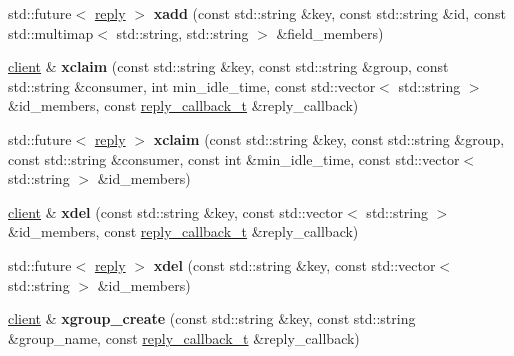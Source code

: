 \begin{DoxyCompactItemize}
std\+::future$<$ \mbox{\hyperlink{classcpp__redis_1_1reply}{reply}} $>$ {\bfseries xadd} (const std\+::string \&key, const std\+::string \&id, const std\+::multimap$<$ std\+::string, std\+::string $>$ \&field\+\_\+members)
\item 
\mbox{\label{classcpp__redis_1_1client_a1c8ca282fc8a80860a7a2c56761debf4}} 
\mbox{\hyperlink{classcpp__redis_1_1client}{client}} \& {\bfseries xclaim} (const std\+::string \&key, const std\+::string \&group, const std\+::string \&consumer, int min\+\_\+idle\+\_\+time, const std\+::vector$<$ std\+::string $>$ \&id\+\_\+members, const \mbox{\hyperlink{classcpp__redis_1_1client_af7a65eb21aa25230bfbb0b0203c4fc04}{reply\+\_\+callback\+\_\+t}} \&reply\+\_\+callback)
\item 
\mbox{\label{classcpp__redis_1_1client_a9788600c1ee887faa49c68b4ae6a6264}} 
std\+::future$<$ \mbox{\hyperlink{classcpp__redis_1_1reply}{reply}} $>$ {\bfseries xclaim} (const std\+::string \&key, const std\+::string \&group, const std\+::string \&consumer, const int \&min\+\_\+idle\+\_\+time, const std\+::vector$<$ std\+::string $>$ \&id\+\_\+members)
\item 
\mbox{\label{classcpp__redis_1_1client_aa04efdc16fc8cf62c6d2fafa45865a06}} 
\mbox{\hyperlink{classcpp__redis_1_1client}{client}} \& {\bfseries xdel} (const std\+::string \&key, const std\+::vector$<$ std\+::string $>$ \&id\+\_\+members, const \mbox{\hyperlink{classcpp__redis_1_1client_af7a65eb21aa25230bfbb0b0203c4fc04}{reply\+\_\+callback\+\_\+t}} \&reply\+\_\+callback)
\item 
\mbox{\label{classcpp__redis_1_1client_aa745d6ed2ed3d4fd17d76961570fbe43}} 
std\+::future$<$ \mbox{\hyperlink{classcpp__redis_1_1reply}{reply}} $>$ {\bfseries xdel} (const std\+::string \&key, const std\+::vector$<$ std\+::string $>$ \&id\+\_\+members)
\item 
\mbox{\label{classcpp__redis_1_1client_a5285eae63adbf09478d0214767363714}} 
\mbox{\hyperlink{classcpp__redis_1_1client}{client}} \& {\bfseries xgroup\+\_\+create} (const std\+::string \&key, const std\+::string \&group\+\_\+name, const \mbox{\hyperlink{classcpp__redis_1_1client_af7a65eb21aa25230bfbb0b0203c4fc04}{reply\+\_\+callback\+\_\+t}} \&reply\+\_\+callback)

\end{DoxyCompactItemize}

